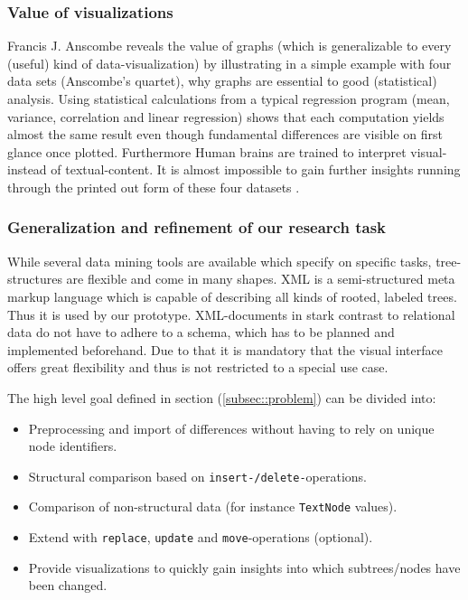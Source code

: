\subsubsection{Value of visualizations}
Francis J. Anscombe reveals the value of graphs (which is generalizable to every (useful) kind of data-visualization) by illustrating in a simple example with four data sets (Anscombe's quartet), why graphs are essential to good (statistical) analysis. Using statistical calculations from a typical regression program (mean, variance, correlation and linear regression) shows that each computation yields almost the same result even though fundamental differences are visible on first glance once plotted. Furthermore Human brains are trained to interpret visual- instead of textual-content. It is almost impossible to gain further insights running through the printed out form of these four datasets \cite{ANSCOMBE}. 

\subsubsection{Generalization and refinement of our research task}
While several data mining tools are available which specify on specific tasks, tree-structures are flexible and come in many shapes. XML is a semi-structured meta markup language which is capable of describing all kinds of rooted, labeled trees. Thus it is used by our prototype. XML-documents in stark contrast to relational data do not have to adhere to a schema, which has to be planned and implemented beforehand. Due to that it is mandatory that the visual interface offers great flexibility and thus is not restricted to a special use case.

The high level goal defined in section (\ref{subsec::problem}) can be divided into:

\begin{itemize}
\item Preprocessing and import of differences without having to rely on unique node identifiers.
\item Structural comparison based on \texttt{insert-/delete-}operations.
\item Comparison of non-structural data (for instance \texttt{TextNode} values).
\item Extend with \texttt{replace}, \texttt{update} and \texttt{move}-operations (optional).
\item Provide visualizations to quickly gain insights into which subtrees/nodes have been changed.
\end{itemize}

